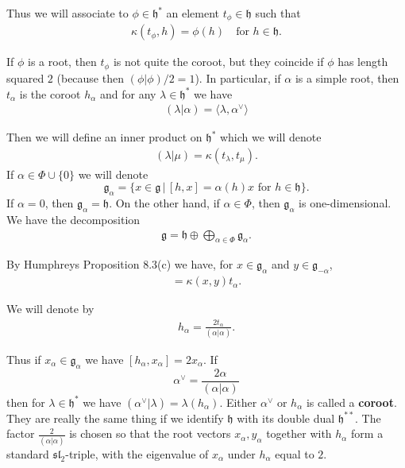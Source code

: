 \documentclass[12pt]{article}
\begin{document}
Thus we will associate to $\phi \in \mathfrak{h}^*$ an element $t_\phi \in \mathfrak{h}$ such that
\begin{align*}
    \kappa(t_\phi, h) = \phi(h) \quad \text{for } h \in \mathfrak{h}.
\end{align*}
\begin{remark}
    If $\phi$ is a root, then $t_\phi$ is not quite the coroot, but they coincide if $\phi$ has length squared $2$ (because then $(\phi|\phi)/2 = 1$). In particular, if $\alpha$ is a simple root, then $t_\alpha$ is the coroot $h_\alpha$ and for any $\lambda \in \mathfrak{h}^*$ we have
    \begin{align*}
        (\lambda|\alpha) = \langle \lambda, \alpha^\vee \rangle
    \end{align*}
\end{remark}



Then we will define an inner product on $\mathfrak{h}^*$ which we will denote
\begin{align*}
    (\lambda | \mu) = \kappa(t_\lambda, t_\mu).
\end{align*}
If $\alpha \in \Phi \cup \{0\}$ we will denote
\[
    \mathfrak{g}_\alpha = \{x \in \mathfrak{g} \,|\, [h,x] = \alpha(h)x \text{ for } h \in \mathfrak{h} \}.
\]
If $\alpha = 0$, then $\mathfrak{g}_\alpha = \mathfrak{h}$. On the other hand, if $\alpha \in \Phi$, then $\mathfrak{g}_\alpha$ is one-dimensional. We have the decomposition
\begin{align*}
    \mathfrak{g} = \mathfrak{h} \oplus \bigoplus_{\alpha \in \Phi} \mathfrak{g}_\alpha.
\end{align*}

By Humphreys Proposition 8.3(c) we have, for $x \in \mathfrak{g}_\alpha$ and $y \in \mathfrak{g}_{-\alpha}$,
\begin{align*}
    [x,y] = \kappa(x,y)t_\alpha.
\end{align*}

We will denote by
\begin{align*}
    h_\alpha = \frac{2t_\alpha}{(\alpha|\alpha)}.
\end{align*}

Thus if $x_\alpha \in \mathfrak{g}_\alpha$ we have $[h_\alpha, x_\alpha] = 2x_\alpha$. If
\[
    \alpha^\vee = \frac{2\alpha}{(\alpha|\alpha)}
\]
then for $\lambda \in \mathfrak{h}^*$ we have $(\alpha^\vee | \lambda) = \lambda(h_\alpha)$. Either $\alpha^\vee$ or $h_\alpha$ is called a \textbf{coroot}. They are really the same thing if we identify $\mathfrak{h}$ with its double dual $\mathfrak{h}^{**}$. The factor $\tfrac{2}{(\alpha|\alpha)}$ is chosen so that the root vectors $x_\alpha, y_\alpha$ together with $h_\alpha$ form a standard $\mathfrak{sl}_2$-triple, with the eigenvalue of $x_\alpha$ under $h_\alpha$ equal to $2$.
\end{document}
